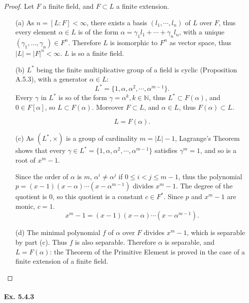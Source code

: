 \documentclass[11pt,a4paper]{article}
\begin{document}
\begin{proof}
Let $F$ a finite field, and $F\subset L$ a finite extension.
\begin{enumerate}
\item[(a)]
As $n = [L:F]<\infty$, there exists a basis $(l_1,\cdots,l_n)$ of $L$  over $F$, thus every element $\alpha \in L$ is of the form $\alpha = \gamma_1 l_1+\cdots +\gamma_n l_n$,  with a unique $(\gamma_1,\ldots,\gamma_n) \in F^n$. Therefore $L$ is isomorphic to $F^n$ as vector space, thus $\vert L \vert = \vert F \vert^n <\infty$. $L$ is so a finite field.

\item[(b)] $L^*$ being the finite multiplicative group of a field is cyclic (Proposition A.5.3), with a generator $\alpha \in L$: 
$$L^* = \{1,\alpha,\alpha^2,\cdots,\alpha^{m-1}\}.$$
Every $\gamma$ in $L^*$ is so of the form $\gamma = \alpha^k, k\in \mathbb{N}$, thus $L^* \subset F(\alpha)$, and $0 \in F[\alpha]$, so $L \subset F(\alpha)$. Moreover $F\subset L$, and $\alpha \in L$, thus $F(\alpha) \subset L$.

$$L = F(\alpha).$$ 

\item[(c)]
As $(L^*,\times)$ is a group of cardinality $m = \vert L \vert - 1$, Lagrange's Theorem shows that every $\gamma  \in L^* = \{1,\alpha,\alpha^2,\cdots,\alpha^{m-1}\}$ satisfies $\gamma^m =1$, and so is a root of $x^m-1$.

Since the order of $\alpha$ is $m$,  $\alpha^i \neq \alpha^j$ if $0 \leq i <j \leq m-1$, thus  the polynomial $p =  (x-1)(x-\alpha)\cdots(x-\alpha^{m-1})$ divides $x^m-1$. The degree of the quotient is 0, so this quotient is a constant $c\in F^*$. Since  $p$ and $x^m-1$ are monic, $c=1$.
$$x^m - 1 = (x-1)(x-\alpha)\cdots(x-\alpha^{m-1}).$$

\item[(d)]
The minimal polynomial $f$ of $\alpha$ over $F$ divides  $x^m-1$, which is separable by part (c). Thus $f$ is also separable. Therefore $\alpha$ is separable, and $L = F(\alpha)$: the Theorem of the Primitive Element is proved in the case of a finite extension of a finite field.

\end{enumerate}
\end{proof}

\paragraph{Ex. 5.4.3}
\end{document}
